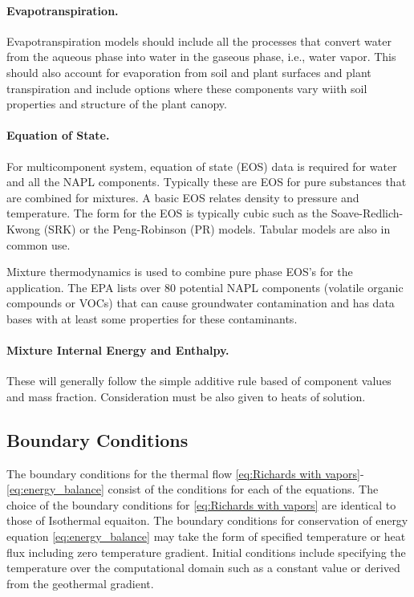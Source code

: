 \paragraph{Evapotranspiration. } 
%
Evapotranspiration models should include all the processes that convert water from the aqueous phase into water in the gaseous phase, 
i.e., water vapor.  
This should also account for evaporation from soil and plant surfaces and plant transpiration and include options 
where these components vary wiith soil properties and structure of the plant canopy.

\paragraph{Equation of State.}
%
For multicomponent system, equation of state (EOS) data is required for water and all the NAPL components.  
Typically these are EOS for pure substances that are combined for mixtures.  
A basic EOS relates density to pressure and temperature.  
The form for the EOS is typically cubic such as the Soave-Redlich-Kwong (SRK) or the
Peng-Robinson (PR) models.  
Tabular models are also in common use.

Mixture thermodynamics is used to combine pure phase EOS's for the application.  
The EPA lists over 80 potential NAPL components
(volatile organic compounds or VOCs) that can cause groundwater
contamination and has data bases with at least some properties for these
contaminants.


\paragraph{Mixture Internal Energy and Enthalpy.} 
%
These will generally follow the simple additive rule based of
component values and mass fraction. Consideration must be also given
to heats of solution.



\subsection{Boundary Conditions}

The boundary conditions for the thermal flow 
\eqref{eq:Richards with vapors}-\eqref{eq:energy_balance}
consist of the conditions for each of the equations.
The choice of the boundary conditions for \eqref{eq:Richards with vapors} are identical to those of Isothermal equaiton.
The boundary conditions for conservation of energy equation \eqref{eq:energy_balance}
may take the form of specified temperature or heat flux including zero temperature gradient. 
Initial conditions include specifying the temperature over the computational domain 
such as a constant value or derived from the geothermal gradient.


